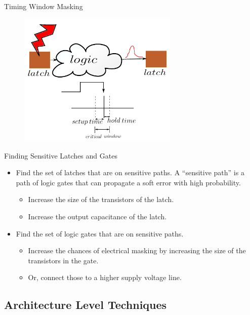 \documentclass{beamer}
\begin{document}
\begin{frame}{Timing Window Masking}
 \begin{center}
  \begin{figure}[h]
    \includegraphics[width=3in]{timing_window_masking}
  \end{figure}
 \end{center}
\end{frame}

\begin{frame}{Finding Sensitive Latches and Gates}
 \begin{itemize}
  \item Find the set of latches that are on sensitive paths. A ``sensitive path'' is a path of logic gates
that can propagate a soft error with high probability.
    \begin{itemize}
      \item Increase the size of the transistors of the latch.
      \item Increase the output capacitance of the latch.
    \end{itemize}
\pause
  \item Find the set of logic gates that are on sensitive paths. 
    \begin{itemize}
      \item Increase the chances of electrical masking by increasing the size of the transistors in the gate.
      \item Or, connect those to a higher supply voltage line.
    \end{itemize}

 \end{itemize}

\end{frame}

\subsection{Architecture Level Techniques}
\end{document}
